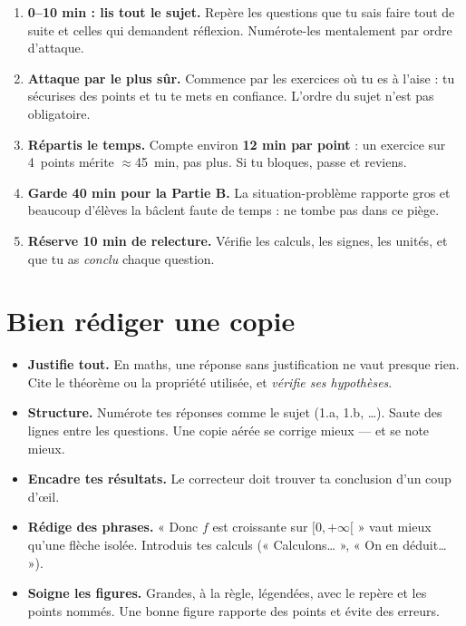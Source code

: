 \begin{enumerate}[label=\textbf{\arabic*.}]
\item \textbf{0–10 min : lis tout le sujet.} Repère les questions que tu sais faire
      tout de suite et celles qui demandent réflexion. Numérote-les mentalement par ordre d'attaque.
\item \textbf{Attaque par le plus sûr.} Commence par les exercices où tu es à l'aise :
      tu sécurises des points et tu te mets en confiance. L'ordre du sujet n'est pas obligatoire.
\item \textbf{Répartis le temps.} Compte environ \textbf{12 min par point} : un exercice
      sur 4~points mérite $\approx$45~min, pas plus. Si tu bloques, passe et reviens.
\item \textbf{Garde 40 min pour la Partie B.} La situation-problème rapporte gros et
      beaucoup d'élèves la bâclent faute de temps : ne tombe pas dans ce piège.
\item \textbf{Réserve 10 min de relecture.} Vérifie les calculs, les signes, les unités,
      et que tu as \emph{conclu} chaque question.
\end{enumerate}

\section{Bien rédiger une copie}

\begin{itemize}
\item \textbf{Justifie tout.} En maths, une réponse sans justification ne vaut presque
      rien. Cite le théorème ou la propriété utilisée, et \emph{vérifie ses hypothèses}.
\item \textbf{Structure.} Numérote tes réponses comme le sujet (1.a, 1.b, …). Saute des
      lignes entre les questions. Une copie aérée se corrige mieux — et se note mieux.
\item \textbf{Encadre tes résultats.} Le correcteur doit trouver ta conclusion d'un coup d'œil.
\item \textbf{Rédige des phrases.} « Donc $f$ est croissante sur $[0,+\infty[$ » vaut mieux
      qu'une flèche isolée. Introduis tes calculs (« Calculons… », « On en déduit… »).
\item \textbf{Soigne les figures.} Grandes, à la règle, légendées, avec le repère et les
      points nommés. Une bonne figure rapporte des points et évite des erreurs.
\end{itemize}

